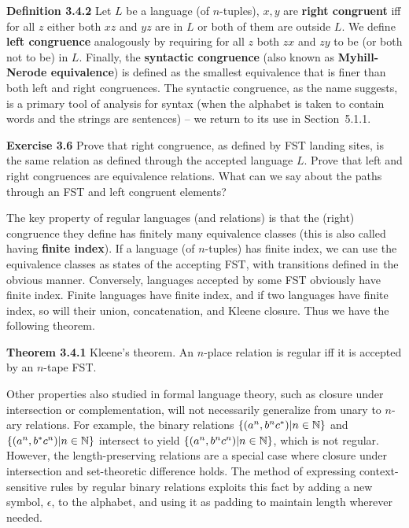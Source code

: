 \smallskip\noindent 
{\bf Definition 3.4.2} Let $L$ be a language (of $n$-tuples), $x,y$ are {\bf
right congruent} iff for all $z$ either both $xz$ and $yz$ are in $L$ or both
of them are outside $L$. We define {\bf left congruence}  analogously by requiring for all $z$ both $zx$ and $zy$ to
be (or both not to be) in $L$. Finally, the {\bf syntactic congruence} (also
known as {\bf Myhill-Nerode equivalence}) is defined as the smallest
equivalence that is finer than both left and right congruences. The syntactic
congruence, as the name suggests, is a primary tool of analysis for syntax
(when the alphabet is taken to contain words and the strings are sentences) --
we return to its use in Section~5.1.1.  

\medskip\noindent
{\bf Exercise 3.6} Prove that right congruence, as defined by FST landing 
sites, is the same relation as defined through the accepted language $L$. 
Prove that left and right congruences are equivalence relations. What can we 
say about the paths through an FST and left congruent elements? 

\smallskip\noindent
The key property of regular languages (and relations) is that the (right)
congruence they define has finitely many equivalence classes (this is also
called having {\bf finite index}).  If a language
(of $n$-tuples) has finite index, we can use the equivalence classes as states
of the accepting FST, with transitions defined in the obvious
manner. Conversely, languages accepted by some FST obviously have finite
index. Finite languages have finite index, and if two languages have finite
index, so will their union, concatenation, and Kleene closure. Thus we have
the following theorem.

\smallskip\noindent
{\bf Theorem 3.4.1} Kleene's theorem. An $n$-place relation is regular iff
it is accepted by an $n$-tape FST. 

\medskip\noindent
Other properties also studied in formal language theory, such as closure under
intersection or complementation, will not necessarily generalize from unary to
$n$-ary relations. For example, the binary relations $\{(a^n,b^nc^*)| n \in
\Bbb N\}$ and $\{(a^n,b^*c^n)| n \in \Bbb N\}$ intersect to yield
$\{(a^n,b^nc^n)| n \in \Bbb N\}$, which is not regular. However, the
length-preserving relations are a special case where closure under
intersection and set-theoretic difference holds. The method of expressing
context-sensitive rules by regular binary relations exploits this fact by
adding a new symbol, $\epsilon$, to the alphabet, and using it as padding to
maintain length wherever needed.

